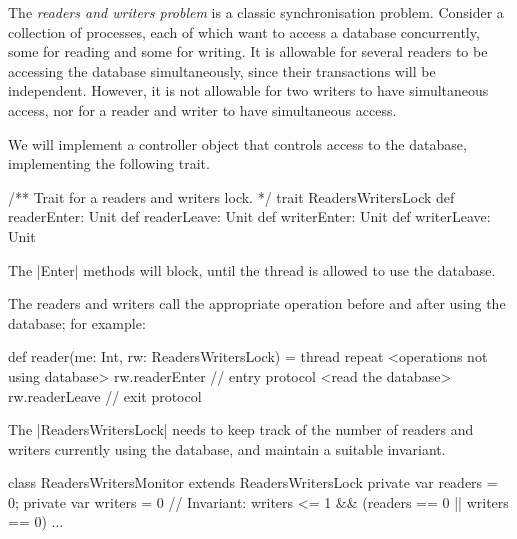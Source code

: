 \begin{slide}

The \emph{readers and writers problem} is a classic synchronisation problem.
Consider a collection of processes, each of which want to access a database
concurrently, some for reading and some for writing.  It is allowable for
several readers to be accessing the database simultaneously, since their
transactions will be independent.  However, it is not allowable for two
writers to have simultaneous access, nor for a reader and writer to have
simultaneous access.
\end{slide}



\begin{slide}

We will implement a controller object that controls access to the database,
implementing the following trait.
\begin{scala}
/** Trait for a readers and writers lock. */
trait ReadersWritersLock{
  def readerEnter: Unit
  def readerLeave: Unit
  def writerEnter: Unit
  def writerLeave: Unit
}
\end{scala}
%
The |Enter| methods will block, until the thread is allowed to use the
database. 
\end{slide}


\begin{slide}

The readers and writers call the appropriate operation before
and after  using the database; for example:
%
\begin{scala}
def reader(me: Int, rw: ReadersWritersLock) = thread{
  repeat{
    <operations not using database>
    rw.readerEnter // entry protocol
    <read the database>
    rw.readerLeave // exit protocol
  }
}
\end{scala}
\end{slide}


\begin{slide}

The |ReadersWritersLock| needs to keep track of the number of readers and
writers currently using the database, and maintain a suitable invariant.
%
\begin{scala}
class ReadersWritersMonitor extends ReadersWritersLock{
  private var readers = 0; private var writers = 0
  // Invariant: writers <= 1 && (readers == 0 || writers == 0)
  ...
}    
\end{scala}
\end{slide}

